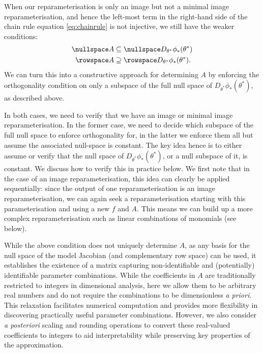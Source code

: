 When our reparameterisation is only an image but not a minimal image reparameterisation, and hence the left-most term in the right-hand side of the chain rule equation \eqref{eq:chainrule} is not injective, we still have the weaker conditions:
\begin{equation}
    \begin{aligned}
\nullspace A &\subseteq \nullspace D_{\theta^*}\phi_*(\theta^*)\\
\rowspace A &\supseteq \rowspace D_{\theta^*}\phi_*(\theta^*).
\end{aligned}
\end{equation}
We can turn this into a constructive approach for determining $A$ by enforcing the orthogonality condition on only a subspace of the full null space of $D_{\theta^*}\phi_*(\theta^*)$, as described above.

In both cases, we need to verify that we have an image or minimal image reparameterisation. In the former case, we need to decide which subspace of the full null space to enforce orthogonality for, in the latter we enforce them all but assume the associated null-space is constant. The key idea hence is to either assume or verify that the null space of $D_{\theta^*}\phi_*(\theta^*)$, or a null subspace of it, is constant. We discuss how to verify this in practice below. We first note that in the case of an image reparameterisation, this idea can clearly be applied sequentially: since the output of one reparameterisation is an image reparameterisation, we can again seek a reparameterisation starting with this parameterisation and using a new $f$ and $A$. This means we can build up a more complex reparameterisation such as linear combinations of monomials (see below).

While the above condition does not uniquely determine $A$, as any basis for the null space of the model Jacobian (and complementary row space) can be used, it establishes the existence of a matrix capturing non-identifiable and (potentially) identifiable parameter combinations. While the coefficients in $A$ are traditionally restricted to integers in dimensional analysis, here we allow them to be arbitrary real numbers and do not require the combinations to be dimensionless \textit{a priori}. This relaxation facilitates numerical computation and provides more flexibility in discovering practically useful parameter combinations. However, we also consider \textit{a posteriori} scaling and rounding operations to convert these real-valued coefficients to integers to aid interpretability while preserving key properties of the approximation.

